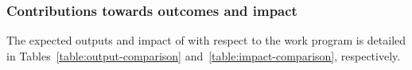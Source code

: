 \subsubsection{Contributions towards outcomes and impact}
\label{sec:countributions-towards-outcome-and-impact}

The expected outputs and impact of \TheProject with respect to the
work program is detailed in Tables~\ref{table:output-comparison}
and~\ref{table:impact-comparison}, respectively.

%
%
%
%
%
%
